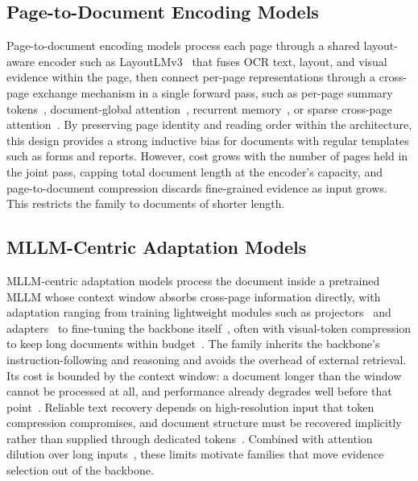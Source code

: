\documentclass[11pt]{article}
\begin{document}
\subsection{Page-to-Document Encoding Models}
\label{sec:arch-p2d}
Page-to-document encoding models process each page through a shared layout-aware encoder such as LayoutLMv3~\cite{huang2022layoutlmv3} that fuses OCR text, layout, and visual evidence within the page, then connect per-page representations through a cross-page exchange mechanism in a single forward pass, such as per-page summary tokens~\cite{tito2023hierarchical}, document-global attention~\cite{blau2024gram}, recurrent memory~\cite{dong2024multi}, or sparse cross-page attention~\cite{borchmann2025arctic}. By preserving page identity and reading order within the architecture, this design provides a strong inductive bias for documents with regular templates such as forms and reports. However, cost grows with the number of pages held in the joint pass, capping total document length at the encoder's capacity, and page-to-document compression discards fine-grained evidence as input grows. This restricts the family to documents of shorter length.

\subsection{MLLM-Centric Adaptation Models}
\label{sec:arch-mllm}
MLLM-centric adaptation models process the document inside a pretrained MLLM whose context window absorbs cross-page information directly, with adaptation ranging from training lightweight modules such as projectors~\cite{tanaka2024instructdoc} and adapters~\cite{zhu2025laytokenllm} to fine-tuning the backbone itself~\cite{duan2025docopilot, xiong2026docr1}, often with visual-token compression to keep long documents within budget~\cite{hu2025mplug2}. The family inherits the backbone's instruction-following and reasoning and avoids the overhead of external retrieval. Its cost is bounded by the context window: a document longer than the window cannot be processed at all, and performance already degrades well before that point~\cite{jia2024leopard}. Reliable text recovery depends on high-resolution input that token compression compromises, and document structure must be recovered implicitly rather than supplied through dedicated tokens~\cite{hannan2025docslm}. Combined with attention dilution over long inputs~\cite{liu2024lost}, these limits motivate families that move evidence selection out of the backbone.
\end{document}
